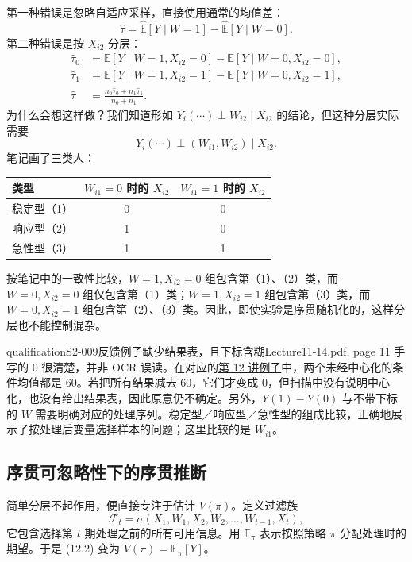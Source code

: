 第一种错误是忽略自适应采样，直接使用通常的均值差：
\[
 \widehat\tau=\widehat{\mathbb E}[Y\mid W=1]
 -\widehat{\mathbb E}[Y\mid W=0].
\]
第二种错误是按 $X_{i2}$ 分层：
\begin{align*}
 \widehat\tau_0&=\mathbb E[Y\mid W=1,X_{i2}=0]
 -\mathbb E[Y\mid W=0,X_{i2}=0],\\
 \widehat\tau_1&=\mathbb E[Y\mid W=1,X_{i2}=1]
 -\mathbb E[Y\mid W=0,X_{i2}=1],\\
 \widehat\tau&=\frac{n_0\widehat\tau_0+n_1\widehat\tau_1}{n_0+n_1}.
\end{align*}
为什么会想这样做？我们知道形如 $Y_i(\cdots)\perp W_{i2}\mid X_{i2}$ 的结论，但这种分层实际需要
\[
 Y_i(\cdots)\perp(W_{i1},W_{i2})\mid X_{i2}.
\]
笔记画了三类人：
\begin{center}
\begin{tabular}{lcc}
 类型 & $W_{i1}=0$ 时的 $X_{i2}$ & $W_{i1}=1$ 时的 $X_{i2}$\\\hline
 稳定型（1） & 0 & 0\\
 响应型（2） & 1 & 0\\
 急性型（3） & 1 & 1
\end{tabular}
\end{center}
按笔记中的一致性比较，$W=1,X_{i2}=0$ 组包含第（1）、（2）类，而 $W=0,X_{i2}=0$ 组仅包含第（1）类；$W=1,X_{i2}=1$ 组包含第（3）类，而 $W=0,X_{i2}=1$ 组包含第（2）、（3）类。因此，即使实验是序贯随机化的，这样分层也不能控制混杂。


\begin{reviewnote}{qualification}{S2-009}{反馈例子缺少结果表，且下标含糊}{Lecture11-14.pdf, page 11}
手写的 $0$ 很清楚，并非 OCR 误读。在对应的\href{https://web.stanford.edu/~swager/stats361.pdf}{第 12 讲例子}中，两个未经中心化的条件均值都是 $60$。若把所有结果减去 $60$，它们才变成 $0$，但扫描中没有说明中心化，也没有给出结果表，因此原意仍不确定。另外，$Y(1)-Y(0)$ 与不带下标的 $W$ 需要明确对应的处理序列。稳定型／响应型／急性型的组成比较，正确地展示了按处理后变量选择样本的问题；这里比较的是 $W_{i1}$。
\end{reviewnote}


\subsection{序贯可忽略性下的序贯推断}
简单分层不起作用，便直接专注于估计 $V(\pi)$。定义过滤族
\[
 \mathcal F_t=\sigma(X_1,W_1,X_2,W_2,\ldots,W_{t-1},X_t),
\]
它包含选择第 $t$ 期处理之前的所有可用信息。用 $\mathbb E_\pi$ 表示按照策略 $\pi$ 分配处理时的期望。于是 (12.2) 变为 $V(\pi)=\mathbb E_\pi[Y]$。

